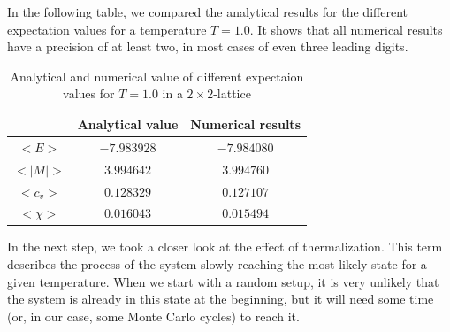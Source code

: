 \documentclass[10pt,a4paper]{article}
\begin{document}
In the following table, we compared the analytical results for the different expectation values for a temperature $T=1.0$. It shows that all numerical results have a precision of at least two, in most cases of even three leading digits.
\begin{table}[h]
	\centering
	\caption{Analytical and numerical value of different expectaion values for $T=1.0$ in a $2\times2$-lattice}
	\begin{tabular}{ccc}
	& Analytical value & Numerical results \\\hline
	$<E>$ & $-7.983928$ & $-7.984080$ \\
	$<|M|>$ & $3.994642$ & $3.994760$ \\
	$<c_v>$ & $0.128329$ & $0.127107$ \\
	$<\chi>$ & $0.016043$ & $0.015494$	
	\end{tabular}	
\end{table}

In the next step, we took a closer look at the effect of thermalization. This term describes the process of the system slowly reaching the most likely state for a given temperature. When we start with a random setup, it is very unlikely that the system is already in this state at the beginning, but it will need some time (or, in our case, some Monte Carlo cycles) to reach it.
\end{document}
